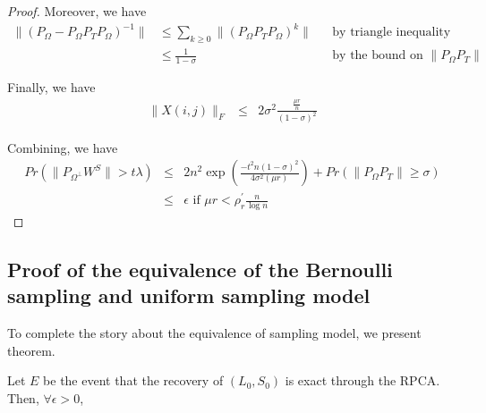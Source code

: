 \begin{proof}
Moreover, we have
\[
\begin{aligned}
\|(P_{\Omega}-P_{\Omega}P_{T}P_{\Omega})^{-1}\| 
& \le \sum_{k\ge0}\|(P_{\Omega}P_{T}P_{\Omega})^{k}\| 
&&\text{by triangle inequality}\\
& \le \frac{1}{1-\sigma} 
&&\text{by the bound on } \|P_{\Omega}P_{T}\|
\end{aligned}
\]

Finally, we have
\begin{eqnarray*}
\|X(i,j)\|_{F} & \le & 2\sigma^{2}\frac{\frac{\mu r}{n}}{(1-\sigma)^{2}}
\end{eqnarray*}


Combining, we have
\begin{eqnarray*}
Pr(\|P_{\Omega^{\bot}}W^{S}\|>t\lambda) & \le & 2n^{2} \exp \left( \frac{-t^{2}n(1-\sigma)^{2}}{4\sigma^{2}(\mu r)} \right)+Pr(\|P_{\Omega}P_{T}\|\ge\sigma)\\
 & \le & \epsilon\text{ if }\mu r<\rho_{r}^{'}\frac{n}{\log n}
\end{eqnarray*}

\end{proof}



\subsection{Proof of the equivalence of the Bernoulli sampling and uniform sampling model } \label{sub:bernoullisampling}
To complete the story about the equivalence of sampling model, we present theorem.
\begin{theorem}
Let $E$ be the event that the recovery of $(L_{0},S_{0})$ is exact
through the RPCA. Then, $\forall\epsilon>0$,
\end{theorem}

